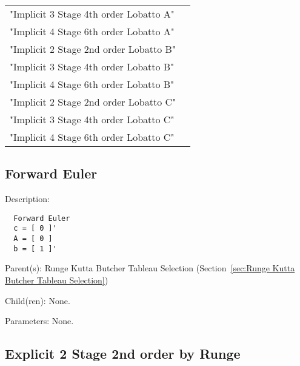 \begin{list}{}
\begin{description}
\begin{tabular}{lp{}}
      "Implicit 3 Stage 4th order Lobatto A" & \\ 
      "Implicit 4 Stage 6th order Lobatto A" & \\ 
      "Implicit 2 Stage 2nd order Lobatto B" & \\ 
      "Implicit 3 Stage 4th order Lobatto B" & \\ 
      "Implicit 4 Stage 6th order Lobatto B" & \\ 
      "Implicit 2 Stage 2nd order Lobatto C" & \\ 
      "Implicit 3 Stage 4th order Lobatto C" & \\ 
      "Implicit 4 Stage 6th order Lobatto C" & \\ 
      \end{tabular}
\end{description}

\end{list}

\subsection{Forward Euler}
\label{sec:Forward Euler-Runge Kutta Butcher Tableau Selection}

\begin{list}{}
  {\setlength{\leftmargin}{1.0in}
   \setlength{\labelwidth}{0.75in}
   \setlength{\labelsep}{0.125in}}
  \item[Description:]
\begin{verbatim}
  Forward Euler
  c = [ 0 ]'
  A = [ 0 ]
  b = [ 1 ]'
\end{verbatim}
  \item[Parent(s):]
    Runge Kutta Butcher Tableau Selection (Section~\ref{sec:Runge Kutta Butcher Tableau Selection})
  \item[Child(ren):]
    None. 
  \item[Parameters:]
    None. 
\end{list}

\subsection{Explicit 2 Stage 2nd order by Runge}
\label{sec:Explicit 2 Stage 2nd order by Runge}

